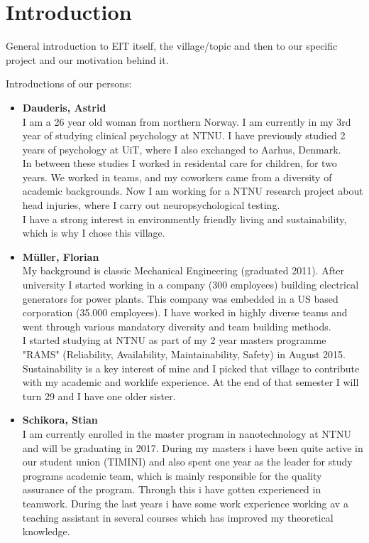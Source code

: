 \section{Introduction}
General introduction to EIT itself, the village/topic and then to our specific project and our motivation behind it.

Introductions of our persons:

\begin{itemize}
    \item \textbf{Dauderis, Astrid}\\
    I am a 26 year old woman from northern Norway. I am currently in my 3rd year of studying clinical psychology at NTNU. I have previously studied 2 years of psychology at UiT, where I also exchanged to Aarhus, Denmark.\\
    In between these studies I worked in residental care for children, for two years. We worked in teams, and my coworkers came from a diversity of academic backgrounds. 
    Now I am working for a NTNU research project about head injuries, where I carry out neuropsychological testing.\\
    I have a strong interest in environmently friendly living and sustainability, which is why I chose this village. 
    \item \textbf{Müller, Florian}\\
    My background is classic Mechanical Engineering (graduated 2011).
    After university I started working in a company (300 employees) building electrical generators for power plants.
    This company was embedded in a US based corporation (35.000 employees).
    I have worked in highly diverse teams and went through various mandatory diversity and team building methods.\\
    I started studying at NTNU as part of my 2 year masters programme "RAMS" (Reliability, Availability, Maintainability, Safety) in August 2015.\\
    Sustainability is a key interest of mine and I picked that village to contribute with my academic and worklife experience.
    At the end of that semester I will turn 29 and I have one older sister.
    \item \textbf{Schikora, Stian}\\
    I am currently enrolled in the master program in nanotechnology at NTNU and will be graduating in 2017. During my masters i have been quite active in our student union (TIMINI) and also spent one year as the leader for study programs academic team, which is mainly responsible for the quality assurance of the program. Through this i have gotten experienced in teamwork. During the last years i have some work experience working av a teaching assistant in several courses which has improved my theoretical knowledge.

\end{itemize}
